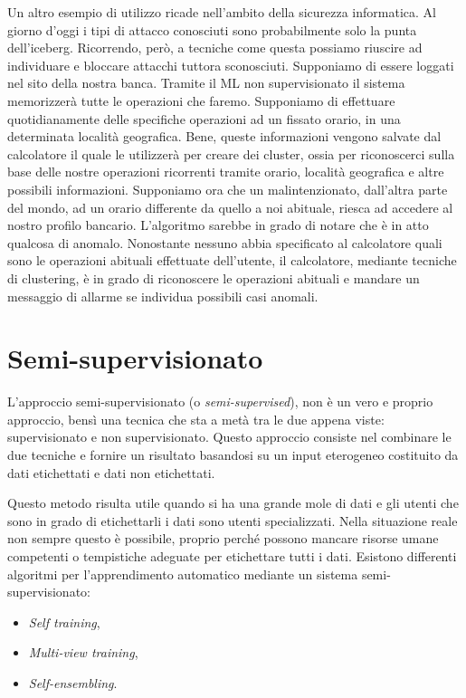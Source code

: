 \documentclass[12pt,italian]{report}
\begin{document}
Un altro esempio di utilizzo ricade nell'ambito della sicurezza informatica. Al giorno d'oggi i tipi di attacco conosciuti sono probabilmente solo la punta dell'iceberg. Ricorrendo, però, a tecniche come questa possiamo riuscire ad individuare e bloccare attacchi tuttora sconosciuti. 
Supponiamo di essere loggati nel sito della nostra banca. Tramite il ML non supervisionato il sistema memorizzerà tutte le operazioni che faremo. Supponiamo di effettuare quotidianamente delle specifiche operazioni ad un fissato orario, in una determinata località geografica. Bene, queste informazioni vengono salvate dal calcolatore il quale le utilizzerà per creare dei cluster, ossia per riconoscerci sulla base delle nostre operazioni ricorrenti tramite orario, località geografica e altre possibili informazioni. Supponiamo ora che un malintenzionato, dall'altra parte del mondo, ad un orario differente da quello a noi abituale, riesca ad accedere al nostro profilo bancario. L'algoritmo sarebbe in grado di notare che è in atto qualcosa di anomalo. Nonostante nessuno abbia specificato al calcolatore quali sono le operazioni abituali effettuate dell'utente, il calcolatore, mediante tecniche di clustering, è in grado di riconoscere le operazioni abituali e mandare un messaggio di allarme se individua possibili casi anomali. 

\section{Semi-supervisionato}

L'approccio semi-supervisionato (o \emph{semi-supervised}), non è un vero e proprio approccio, bensì una tecnica che sta a metà tra le due appena viste: supervisionato e non supervisionato. Questo approccio consiste nel combinare le due tecniche e fornire un risultato basandosi su un input eterogeneo costituito da dati etichettati e dati non etichettati.

Questo metodo risulta utile quando si ha una grande mole di dati e gli utenti che sono in grado di etichettarli i dati sono utenti specializzati. Nella situazione reale non sempre questo è possibile, proprio perché possono mancare risorse umane competenti o tempistiche adeguate per etichettare tutti i dati. Esistono differenti algoritmi per l'apprendimento automatico mediante un sistema semi-supervisionato:
\begin{itemize}
	\item \emph{Self training},
	\item \emph{Multi-view training},
	\item \emph{Self-ensembling}.
\end{itemize}
\end{document}
